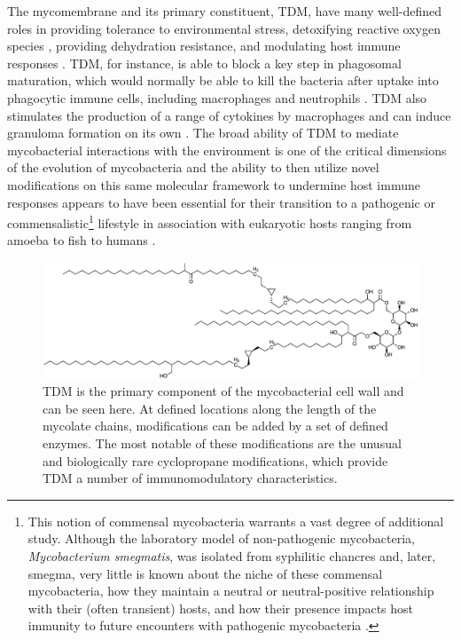 The mycomembrane and its primary constituent, TDM, have many well\hyp{}defined roles in providing tolerance to environmental stress, detoxifying reactive oxygen species \citep{Chan1989}, providing dehydration resistance, and modulating host immune responses \citep{Lima2001, Ryll2001, Harland2008, Patin2017b, Asmar2016, Das2013a, Hunter2016}. TDM, for instance, is able to block a key step in phagosomal maturation, which would normally be able to kill the bacteria after uptake into phagocytic immune cells, including macrophages and neutrophils \citep{Axelrod2008, Indrigo2003, Spargo1991}. TDM also stimulates the production of a range of cytokines by macrophages and can induce granuloma formation on its own \citep{Korf2005}. The broad ability of TDM to mediate mycobacterial interactions with the environment is one of the critical dimensions of the evolution of mycobacteria and the ability to then utilize novel modifications on this same molecular framework to undermine host immune responses appears to have been essential for their transition to a pathogenic or commensalistic\footnote{This notion of commensal mycobacteria warrants a vast degree of additional study. Although the laboratory model of non\hyp{}pathogenic mycobacteria, \textit{Mycobacterium smegmatis}, was isolated from syphilitic chancres and, later, smegma, very little is known about the niche of these commensal mycobacteria, how they maintain a neutral or neutral\hyp{}positive relationship with their (often transient) hosts, and how their presence impacts host immunity to future encounters with pathogenic mycobacteria \citep{Robinson2018}.} lifestyle in association with eukaryotic hosts ranging from amoeba to fish to humans \citep{Hagedorn2009, Salah2009, Delafont2014, Honda2018, Falkinham2009}.

\begin{figure}
\centering
\includegraphics[width=\textwidth]{images/tdm.pdf}
\caption{TDM is the primary component of the mycobacterial cell wall and can be seen here. At defined locations along the length of the mycolate chains, modifications can be added by a set of defined enzymes. The most notable of these modifications are the unusual and biologically rare cyclopropane modifications, which provide TDM a number of immunomodulatory characteristics.}
\label{figure:tdm}
\end{figure}

